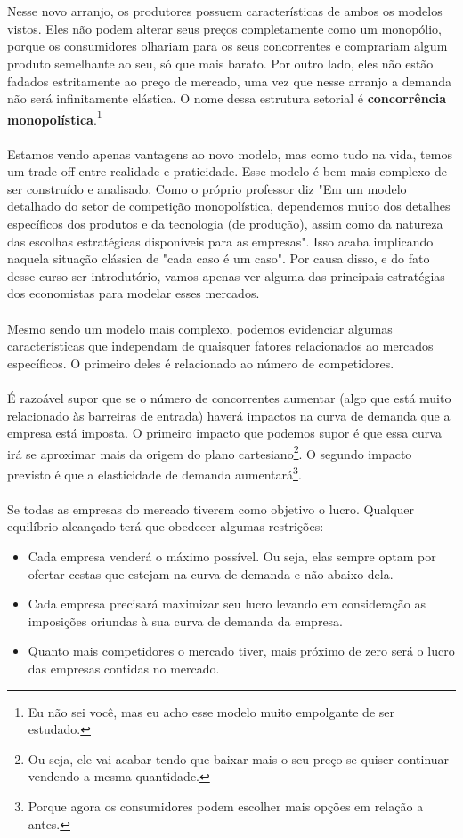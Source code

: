 \documentclass[a4paper,11pt,oneside]{book}
\theoremstyle{definition}
\theoremstyle{break}
\begin{document}
\\
\\
Nesse novo arranjo, os produtores possuem características de ambos os modelos vistos. Eles não podem alterar seus preços completamente como um monopólio, porque os consumidores olhariam para os seus concorrentes e comprariam algum produto semelhante ao seu, só que mais barato. Por outro lado, eles não estão fadados estritamente ao preço de mercado, uma vez que nesse arranjo a demanda não será infinitamente elástica. O nome dessa estrutura setorial é \textbf{concorrência monopolística}.\footnote{Eu não sei você, mas eu acho esse modelo muito empolgante de ser estudado.}
\\
\\
Estamos vendo apenas vantagens ao novo modelo, mas como tudo na vida, temos um trade-off entre realidade e praticidade. Esse modelo é bem mais complexo de ser construído e analisado. Como o próprio professor diz "Em um modelo detalhado do setor de competição monopolística, dependemos muito dos detalhes específicos dos produtos e da tecnologia (de produção), assim como da natureza das escolhas estratégicas disponíveis para as empresas". Isso acaba implicando naquela situação clássica de "cada caso é um caso". Por causa disso, e do fato desse curso ser introdutório, vamos apenas ver alguma das principais estratégias dos economistas para modelar esses mercados.
\\
\\
Mesmo sendo um modelo mais complexo, podemos evidenciar algumas características que independam de quaisquer fatores relacionados ao mercados específicos. O primeiro deles é relacionado ao número de competidores.
\\
\\
É razoável supor que se o número de concorrentes aumentar (algo que está muito relacionado às barreiras de entrada) haverá impactos na curva de demanda que a empresa está imposta. O primeiro impacto que podemos supor é que essa curva irá se aproximar mais da origem do plano cartesiano\footnote{Ou seja, ele vai acabar tendo que baixar mais o seu preço se quiser continuar vendendo a mesma quantidade.}. O segundo impacto previsto é que a elasticidade de demanda aumentará\footnote{Porque agora os consumidores podem escolher mais opções em relação a antes.}.
\\
\\
Se todas as empresas do mercado tiverem como objetivo o lucro. 
Qualquer equilíbrio alcançado terá que obedecer algumas restrições:
\begin{itemize}
\item Cada empresa venderá o máximo possível. Ou seja, elas sempre optam por ofertar cestas que estejam na curva de demanda e não abaixo dela.
\item Cada empresa precisará maximizar seu lucro levando em consideração as imposições oriundas à sua curva de demanda da empresa.
\item Quanto mais competidores o mercado tiver, mais próximo de zero será o lucro das empresas contidas no mercado.
\end{itemize}
\end{document}

